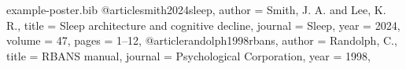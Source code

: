 
\begin{filecontents}{example-poster.bib}
@article{smith2024sleep,
  author  = {Smith, J. A. and Lee, K. R.},
  title   = {Sleep architecture and cognitive decline},
  journal = {Sleep},
  year    = {2024},
  volume  = {47},
  pages   = {1--12},
}
@article{randolph1998rbans,
  author  = {Randolph, C.},
  title   = {RBANS manual},
  journal = {Psychological Corporation},
  year    = {1998},
}
\end{filecontents}

\documentclass[palette=uom, size=a0]{rossposter}


  {University of Limerick}{ross.dunne@ul.ie}
  {Trinity College Dublin}{s.mitchell@tcd.ie}
  {University of Limerick}{ann-marie.moriarty@ul.ie}




